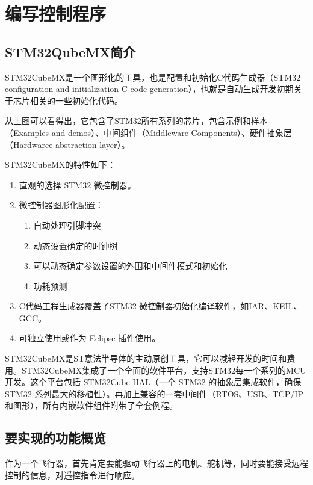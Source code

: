 \documentclass{article}
\begin{document}
\section{编写控制程序}
\subsection{STM32QubeMX简介}
STM32CubeMX是一个图形化的工具，也是配置和初始化C代码生成器（STM32 configuration and initialization C code generation），也就是自动生成开发初期关于芯片相关的一些初始化代码。

从上图可以看得出，它包含了STM32所有系列的芯片，包含示例和样本（Examples and demos）、中间组件（Middleware Components）、硬件抽象层（Hardwaree abstraction layer）。

STM32CubeMX的特性如下：
\begin{enumerate}
\item 直观的选择 STM32 微控制器。

\item 微控制器图形化配置：
\begin{enumerate}
	\item 自动处理引脚冲突
	\item 动态设置确定的时钟树
	
	\item 可以动态确定参数设置的外围和中间件模式和初始化
	
	\item 功耗预测
\end{enumerate}

\item C代码工程生成器覆盖了STM32 微控制器初始化编译软件，如IAR、KEIL、GCC。

\item 可独立使用或作为 Eclipse 插件使用。

\end{enumerate}




STM32CubeMX是ST意法半导体的主动原创工具，它可以减轻开发的时间和费用。STM32CubeMX集成了一个全面的软件平台，支持STM32每一个系列的MCU开发。这个平台包括 STM32Cube HAL（一个 STM32 的抽象层集成软件，确保STM32 系列最大的移植性）。再加上兼容的一套中间件（RTOS、USB、TCP/IP 和图形），所有内嵌软件组件附带了全套例程。
\subsection{要实现的功能概览}
作为一个飞行器，首先肯定要能驱动飞行器上的电机、舵机等，同时要能接受远程控制的信息，对遥控指令进行响应。
\end{document}
